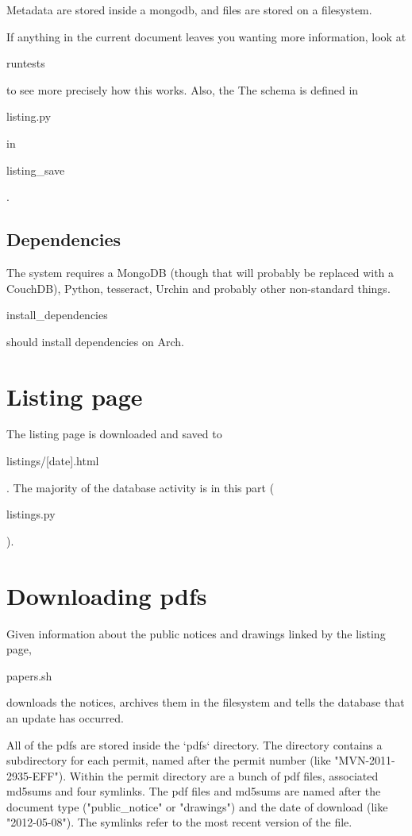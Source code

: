 \documentclass{article}
\begin{document}
Metadata are stored inside a mongodb, and files are stored on a filesystem.

If anything in the current document leaves you wanting more information, look
at \begin{texttt}runtests\end{texttt} to see more precisely how this works.
Also, the The schema is defined in \begin{texttt}listing.py\end{texttt} in
\begin{texttt}listing\_save\end{texttt}.

\subsection{Dependencies}
The system requires a MongoDB (though that will probably be replaced with a
CouchDB), Python, tesseract, Urchin and probably other non-standard things.
\begin{texttt}install\_dependencies\end{texttt} should install dependencies
on Arch.

\section{Listing page}
The listing page is downloaded and saved to \begin{texttt}listings/[date].html\end{texttt}.
The majority of the database activity is in this part (\begin{texttt}listings.py\end{texttt}).

\section{Downloading pdfs}
Given information about the public notices and drawings linked by the listing
page, \begin{texttt}papers.sh\end{texttt} downloads the notices, archives them in the filesystem
and tells the database that an update has occurred.

All of the pdfs are stored inside the `pdfs` directory. The directory contains
a subdirectory for each permit, named after the permit number (like
"MVN-2011-2935-EFF"). Within the permit directory are a bunch of pdf files,
associated md5sums and four symlinks. The pdf files and md5sums are named
after the document type ("public\_notice" or "drawings") and the date of download
(like "2012-05-08"). The symlinks refer to the most recent version of the file.
\end{document}
